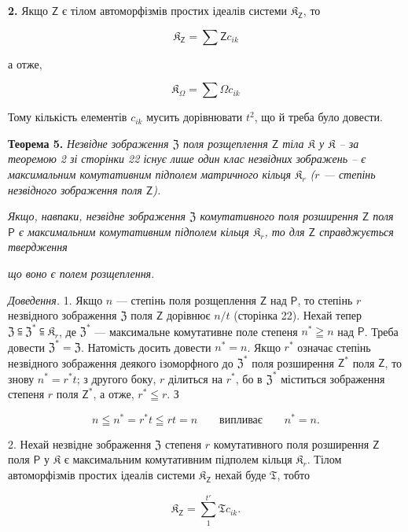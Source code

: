 \documentclass[11pt]{article}
\begin{document}
\textbf{2.} Якщо \(\mathsf{Z}\) є тілом автоморфізмів простих ідеалів системи \(\mathfrak K_{\mathsf{Z}}\), то

\[
\mathfrak K_{\mathsf{Z}}=\sum\mathsf Zc_{ik}
\]

а отже,

\[
\mathfrak K_\Omega=\sum\Omega c_{ik}
\]

Тому кількість елементів \(c_{ik}\) мусить дорівнювати \(t^2\), що й треба було довести.

\textbf{Теорема 5.} \emph{Незвідне зображення \(\mathfrak Z\) поля розщеплення \(\mathsf{Z}\) тіла \(\mathfrak K\) у \(\mathfrak K\) -- за теоремою 2 зі сторінки 22 існує лише один клас незвідних зображень -- є максимальним комутативним підполем матричного кільця \(\mathfrak K_r\) (\(r\) --- степінь незвідного зображення поля \(\mathsf{Z}\)).}

\emph{Якщо, навпаки, незвідне зображення \(\mathfrak Z\) комутативного поля розширення \(\mathsf{Z}\) поля \(\mathsf P\) є максимальним комутативним підполем кільця \(\mathfrak K_r\), то для \(\mathsf{Z}\) справджується твердження}

\emph{що воно є полем розщеплення.}

\emph{Доведення.} 1. Якщо \(n\) --- степінь поля розщеплення \(\mathsf{Z}\) над \(\mathsf P\), то степінь \(r\) незвідного зображення \(\mathfrak Z\) поля \(\mathsf{Z}\) дорівнює \(n/t\) (сторінка 22). Нехай тепер \(\mathfrak Z\subseteqq\mathfrak Z^*\subseteqq\mathfrak K_r\), де \(\mathfrak Z^*\) --- максимальне комутативне поле степеня \(n^*\geqq n\) над \(\mathsf P\). Треба довести \(\mathfrak Z^*=\mathfrak Z\). Натомість досить довести \(n^*=n\). Якщо \(r^*\) означає степінь незвідного зображення деякого ізоморфного до \(\mathfrak Z^*\) поля розширення \(\mathsf{Z}^*\) поля \(\mathsf{Z}\), то знову \(n^*=r^*t\); з другого боку, \(r\) ділиться на \(r^*\), бо в \(\mathfrak Z^*\) міститься зображення степеня \(r\) поля \(\mathsf{Z}^*\), а отже, \(r^*\leqq r\). З

\[
n\leqq n^*=r^*t\leqq rt=n \qquad\text{випливає}\qquad n^*=n.
\]

2. Нехай незвідне зображення \(\mathfrak Z\) степеня \(r\) комутативного поля розширення \(\mathsf{Z}\) поля \(\mathsf P\) у \(\mathfrak K\) є максимальним комутативним підполем кільця \(\mathfrak K_r\). Тілом автоморфізмів простих ідеалів системи \(\mathfrak K_{\mathsf{Z}}\) нехай буде \(\mathfrak T\), тобто

\[
\mathfrak K_{\mathsf{Z}}=\sum_{1}^{t'}\mathfrak T c_{ik}.
\]
\end{document}
